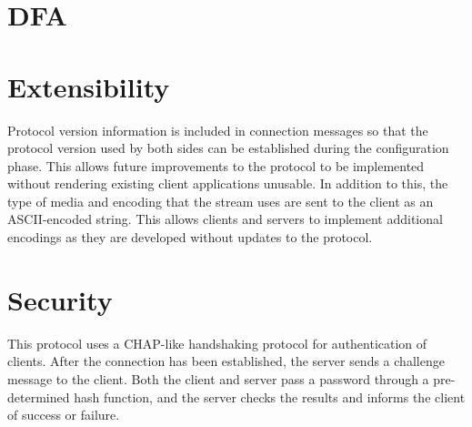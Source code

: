 \documentclass[12pt,letterpaper,titlepage]{article}
\begin{document}
\section{DFA}


\section{Extensibility}
Protocol version information is included in connection messages so that the protocol version used by both sides can be established during the configuration phase.  This allows future improvements to the protocol to be implemented without rendering existing client applications unusable. In addition to this, the type of media and encoding that the stream uses are sent to the client as an ASCII-encoded string. This allows clients and servers to implement additional encodings as they are developed without updates to the protocol.

\section{Security}
This protocol uses a CHAP-like handshaking protocol for authentication of clients.  After the connection has been established, the server sends a challenge message to the client.  Both the client and server pass a password through a pre-determined hash function, and the server checks the results and informs the client of success or failure.
\end{document}
